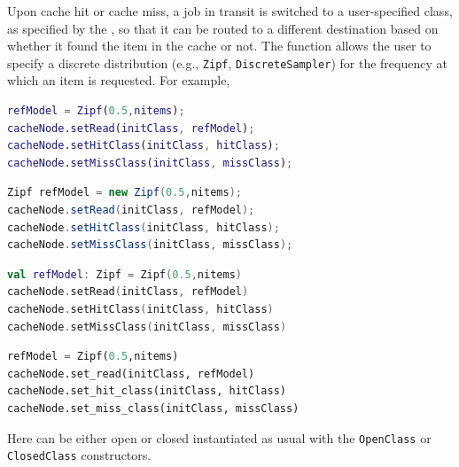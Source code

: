 Upon cache hit or cache miss, a job in transit is switched to a user-specified class, as specified by the , so that it can be routed to a different destination based on whether it found the item in the cache or not. The  function allows the user to specify a discrete distribution (e.g., \texttt{Zipf}, \texttt{DiscreteSampler}) for the frequency at which an item is requested. For example,
\begin{MATLAB}
\begin{lstlisting}[language = matlab]
refModel = Zipf(0.5,nitems);
cacheNode.setRead(initClass, refModel);
cacheNode.setHitClass(initClass, hitClass);
cacheNode.setMissClass(initClass, missClass);
\end{lstlisting}
\end{MATLAB}
\begin{JAVA}
\begin{lstlisting}[language = java, basicstyle=\ttfamily\scriptsize]
Zipf refModel = new Zipf(0.5,nitems);
cacheNode.setRead(initClass, refModel);
cacheNode.setHitClass(initClass, hitClass);
cacheNode.setMissClass(initClass, missClass);
\end{lstlisting}
\end{JAVA}
\begin{KOTLIN}
\begin{lstlisting}[language = kotlin, basicstyle=\ttfamily\scriptsize]
val refModel: Zipf = Zipf(0.5,nitems)
cacheNode.setRead(initClass, refModel)
cacheNode.setHitClass(initClass, hitClass)
cacheNode.setMissClass(initClass, missClass)
\end{lstlisting}
\end{KOTLIN}
\begin{PYTHON}
\begin{lstlisting}[language = python]
refModel = Zipf(0.5,nitems)
cacheNode.set_read(initClass, refModel)
cacheNode.set_hit_class(initClass, hitClass)
cacheNode.set_miss_class(initClass, missClass)
\end{lstlisting}
\end{PYTHON}
Here  can be either open or closed instantiated as usual with the \texttt{OpenClass} or \texttt{ClosedClass} constructors.

